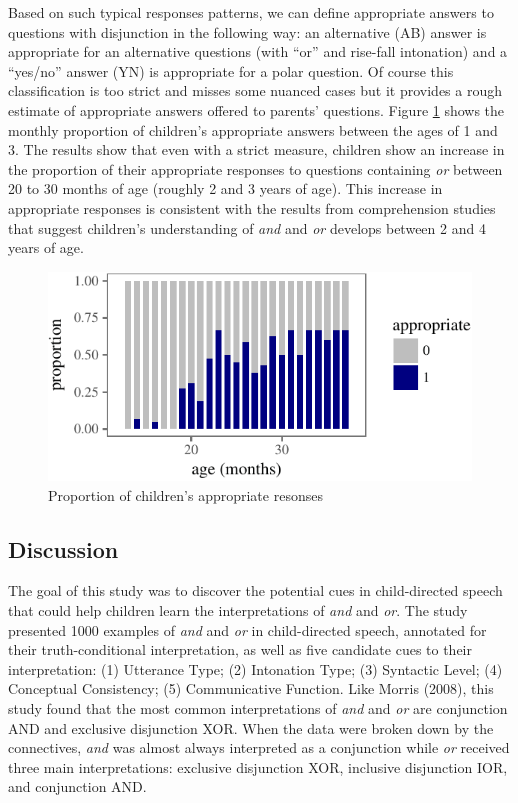 \documentclass[oneside]{report}
\theoremstyle{definition}
\theoremstyle{definition}
\theoremstyle{definition}
\theoremstyle{remark}
\begin{document}
Based on such typical responses patterns, we can define appropriate
answers to questions with disjunction in the following way: an
alternative (AB) answer is appropriate for an alternative questions
(with ``or'' and rise-fall intonation) and a ``yes/no'' answer (YN) is
appropriate for a polar question. Of course this classification is too
strict and misses some nuanced cases but it provides a rough estimate of
appropriate answers offered to parents' questions. Figure
\ref{fig:answerHitsPlot} shows the monthly proportion of children's
appropriate answers between the ages of 1 and 3. The results show that
even with a strict measure, children show an increase in the proportion
of their appropriate responses to questions containing \emph{or} between
20 to 30 months of age (roughly 2 and 3 years of age). This increase in
appropriate responses is consistent with the results from comprehension
studies that suggest children's understanding of \emph{and} and
\emph{or} develops between 2 and 4 years of age.
\begin{figure}[tb]

{\centering \includegraphics{figs/answerHitsPlot-1} 

}

\caption{Proportion of children's appropriate resonses}\label{fig:answerHitsPlot}
\end{figure}
\subsection{Discussion}\label{discussion-1}

The goal of this study was to discover the potential cues in
child-directed speech that could help children learn the interpretations
of \emph{and} and \emph{or}. The study presented 1000 examples of
\emph{and} and \emph{or} in child-directed speech, annotated for their
truth-conditional interpretation, as well as five candidate cues to
their interpretation: (1) Utterance Type; (2) Intonation Type; (3)
Syntactic Level; (4) Conceptual Consistency; (5) Communicative Function.
Like Morris (2008), this study found that the most common
interpretations of \emph{and} and \emph{or} are conjunction AND and
exclusive disjunction XOR. When the data were broken down by the
connectives, \emph{and} was almost always interpreted as a conjunction
while \emph{or} received three main interpretations: exclusive
disjunction XOR, inclusive disjunction IOR, and conjunction AND.
\end{document}
